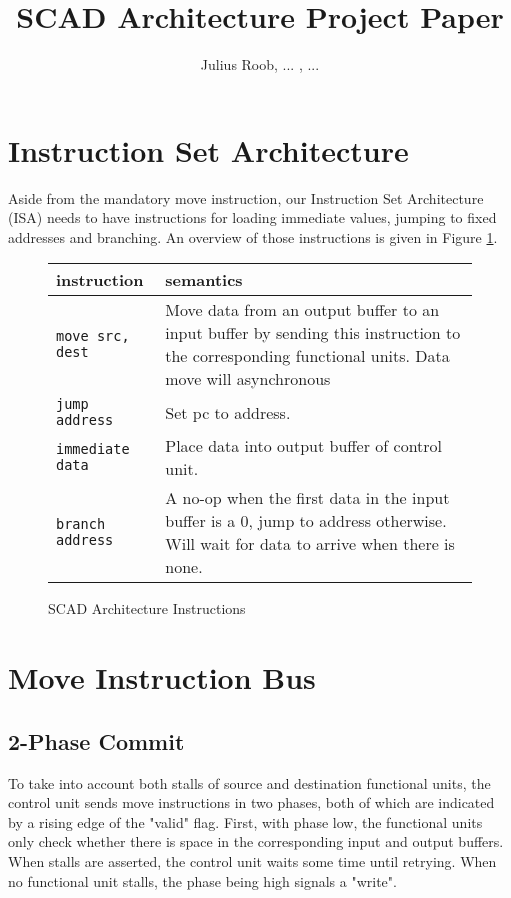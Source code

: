 \documentclass[adraft]{eptcs}
\title{SCAD Architecture Project Paper}
\author{Julius Roob, ...
	\institute{University of Kaiserslautern, Embedded Systems Group}
	\email{julius@juliusroob.de}, ...
}
\begin{document}
	\maketitle \newpage
	\tableofcontents \newpage
	\section{Instruction Set Architecture}
		Aside from the mandatory move instruction, our Instruction Set Architecture (ISA) needs to have instructions for loading immediate values, jumping to fixed addresses and branching.
		An overview of those instructions is given in Figure \ref{fig:instruction_table}.
		
		\begin{figure}
			\begin{center}
				\begin{tabular}{| l | p{7cm} |}
					\hline
					\textbf{instruction} & \textbf{semantics} \\ \hline
					\lstinline{move src, dest} & Move data from an output buffer to an input buffer by sending this instruction to the corresponding functional units. Data move will asynchronous \\ \hline
					\lstinline{jump address} & Set pc to address. \\ \hline
					\lstinline{immediate data} & Place data into output buffer of control unit. \\ \hline
					\lstinline{branch address} & A no-op when the first data in the input buffer is a 0, jump to address otherwise. Will wait for data to arrive when there is none. \\ \hline
				\end{tabular}
				\label{fig:instruction_table}
				\caption{SCAD Architecture Instructions}
			\end{center}
		\end{figure}
		
	\section{Move Instruction Bus}
		\subsection{2-Phase Commit}
			To take into account both stalls of source and destination functional units, the control unit sends move instructions in two phases, both of which are indicated by a rising edge of the "valid" flag.
			First, with phase low, the functional units only check whether there is space in the corresponding input and output buffers.
			When stalls are asserted, the control unit waits some time until retrying.
			When no functional unit stalls, the phase being high signals a "write".
			
\end{document}

